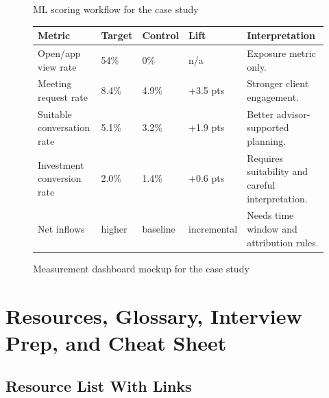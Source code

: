 \documentclass[
	11pt,
	fleqn,
	a4paper,
	oneside,
]{LegrandOrangeBook}
\begin{document}
\begin{figure}[H]
	\centering
	\caption{ML scoring workflow for the case study}
\end{figure}

\begin{figure}[H]
	\centering
	\begin{tabularx}{\textwidth}{L{0.22\textwidth} C{0.16\textwidth} C{0.16\textwidth} C{0.16\textwidth} Y}
		\toprule
		\textbf{Metric} & \textbf{Target} & \textbf{Control} & \textbf{Lift} & \textbf{Interpretation}\\
		\midrule
		Open/app view rate & 54\% & 0\% & n/a & Exposure metric only.\\
		Meeting request rate & 8.4\% & 4.9\% & +3.5 pts & Stronger client engagement.\\
		Suitable conversation rate & 5.1\% & 3.2\% & +1.9 pts & Better advisor-supported planning.\\
		Investment conversion rate & 2.0\% & 1.4\% & +0.6 pts & Requires suitability and careful interpretation.\\
		Net inflows & higher & baseline & incremental & Needs time window and attribution rules.\\
		\bottomrule
	\end{tabularx}
	\caption{Measurement dashboard mockup for the case study}
\end{figure}

\chapter{Resources, Glossary, Interview Prep, and Cheat Sheet}

\section{Resource List With Links}
\end{document}
